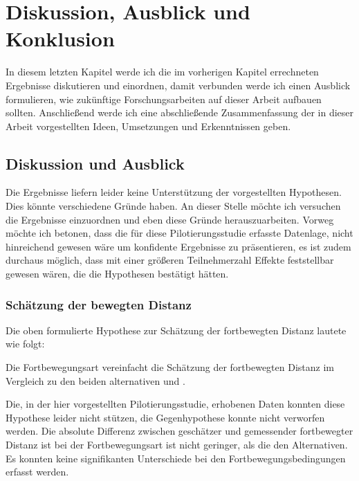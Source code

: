 

\chapter{Diskussion, Ausblick und Konklusion}\label{chapter:discussion-conclusion}
    In diesem letzten Kapitel werde ich die im vorherigen Kapitel errechneten Ergebnisse diskutieren und einordnen, damit verbunden werde ich einen Ausblick formulieren, wie zukünftige Forschungsarbeiten auf dieser Arbeit aufbauen sollten. Anschließend werde ich eine abschließende Zusammenfassung der in dieser Arbeit vorgestellten Ideen, Umsetzungen und Erkenntnissen geben.

    \section{Diskussion und Ausblick}
        Die Ergebnisse liefern leider keine Unterstützung der vorgestellten Hypothesen. Dies könnte verschiedene Gründe haben. An dieser Stelle möchte ich versuchen die Ergebnisse einzuordnen und eben diese Gründe herauszuarbeiten.
        Vorweg möchte ich betonen, dass die für diese Pilotierungsstudie erfasste Datenlage, nicht hinreichend gewesen wäre um konfidente Ergebnisse zu präsentieren, es ist zudem  durchaus möglich, dass mit einer größeren Teilnehmerzahl Effekte feststellbar gewesen wären, die die Hypothesen bestätigt hätten.

        \subsection{Schätzung der bewegten Distanz}
            Die oben formulierte Hypothese zur Schätzung der fortbewegten Distanz lautete wie folgt:

            Die  Fortbewegungsart vereinfacht die Schätzung der fortbewegten Distanz im Vergleich zu den beiden alternativen  und .

            Die, in der hier vorgestellten Pilotierungsstudie, erhobenen Daten konnten diese Hypothese leider nicht stützen, die Gegenhypothese konnte nicht verworfen werden. Die absolute Differenz zwischen geschätzer und gemessender fortbewegter Distanz ist bei der Fortbewegungsart  ist nicht geringer, als die den Alternativen. Es konnten keine signifikanten  Unterschiede bei den Fortbewegungsbedingungen erfasst werden.


